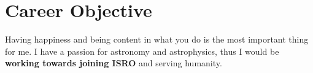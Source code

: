 \documentclass[11pt]{article}
\begin{document}
\begin{minipage}{0.75\linewidth}
\section{\color{green}Car\color{black}eer Objective}
Having happiness and being content in what you do is the most important thing for me. I have a passion for astronomy and astrophysics, thus I would be \textbf{working towards joining ISRO} and serving humanity.
\end{minipage}
\end{document}
